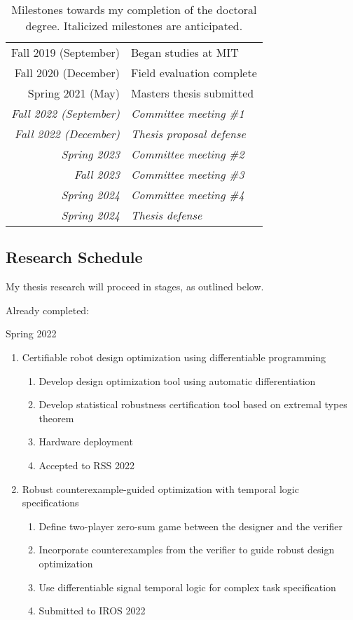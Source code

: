 \begin{table}[h]
\centering
\caption{Milestones towards my completion of the doctoral degree. Italicized milestones are anticipated.}
\label{ch9:tab:degree_milestones}
\begin{tabular}{rl}
Fall 2019 (September)          & Began studies at MIT             \\
Fall 2020 (December)           & Field evaluation complete        \\
Spring 2021 (May)              & Masters thesis submitted         \\
\textit{Fall 2022 (September)} & \textit{Committee meeting \#1}   \\
\textit{Fall 2022 (December)}  & \textit{Thesis proposal defense} \\
\textit{Spring 2023}           & \textit{Committee meeting \#2}   \\
\textit{Fall 2023}             & \textit{Committee meeting \#3}   \\
\textit{Spring 2024}           & \textit{Committee meeting \#4}   \\
\textit{Spring 2024}           & \textit{Thesis defense}
\end{tabular}
\end{table}

\subsection{Research Schedule}

My thesis research will proceed in stages, as outlined below.

Already completed:

Spring 2022
\begin{enumerate}
    \item Certifiable robot design optimization using differentiable programming
    \begin{enumerate}
        \item Develop design optimization tool using automatic differentiation
        \item Develop statistical robustness certification tool based on extremal types theorem
        \item Hardware deployment
        \item Accepted to RSS 2022
    \end{enumerate}
    \item Robust counterexample-guided optimization with temporal logic specifications
    \begin{enumerate}
        \item Define two-player zero-sum game between the designer and the verifier
        \item Incorporate counterexamples from the verifier to guide robust design optimization
        \item Use differentiable signal temporal logic for complex task specification
        \item Submitted to IROS 2022
    \end{enumerate}
\end{enumerate}


